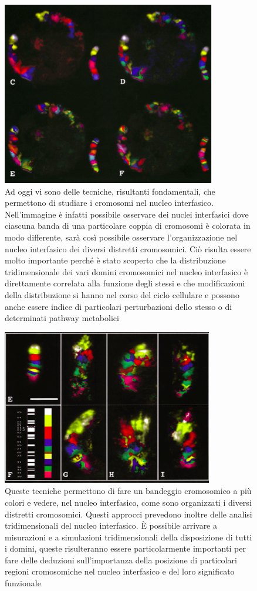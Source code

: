 \documentclass[11pt]{book}
\begin{document}
\begin{figure}[h!]
\centering
\includegraphics[scale=0.60]{img/20.png}
\caption{Ad oggi vi sono delle tecniche, risultanti fondamentali, che permettono di studiare i cromosomi nel nucleo interfasico. Nell’immagine è infatti possibile osservare dei nuclei
interfasici dove ciascuna banda di una particolare coppia di cromosomi è colorata in modo differente, sarà così possibile osservare l’organizzazione nel nucleo interfasico dei diversi distretti cromosomici. Ciò risulta essere molto importante perché è stato scoperto che la distribuzione tridimensionale dei vari domini cromosomici nel nucleo interfasico è direttamente correlata alla funzione degli stessi e che modificazioni della distribuzione si hanno nel corso del ciclo cellulare e possono anche essere indice di particolari perturbazioni dello stesso o di determinati pathway metabolici}
\label{}
\end{figure}

\begin{figure}[ht!]
\centering
\includegraphics[scale=0.70]{img/21.png}
\caption{Queste tecniche permettono di fare un bandeggio cromosomico a più colori e vedere, nel nucleo interfasico, come sono organizzati i diversi distretti cromosomici. 
Questi approcci prevedono inoltre delle analisi tridimensionali del nucleo interfasico. È possibile arrivare a misurazioni e a simulazioni tridimensionali della disposizione di tutti i domini, queste risulteranno essere particolarmente importanti per fare delle deduzioni sull’importanza della posizione di particolari regioni cromosomiche nel nucleo interfasico e del loro significato funzionale}
\label{}
\end{figure}
\end{document}
